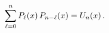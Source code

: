 \[\sum_{\ell=0}^{n}\mathop{P_{\ell}\/}\nolimits\!\left(x\right)\mathop{P_{n-\ell%
}\/}\nolimits\!\left(x\right)=\mathop{U_{n}\/}\nolimits\!\left(x\right).\]
